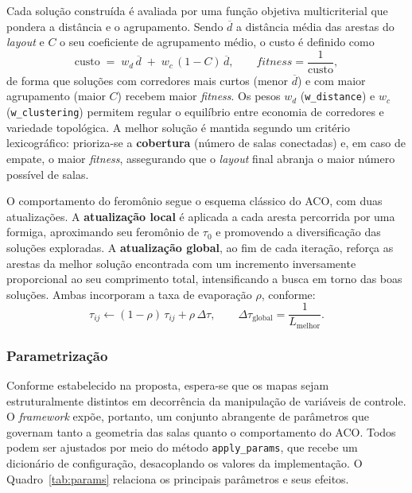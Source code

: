 \documentclass[12pt]{article}
\begin{document}
Cada solução construída é avaliada por uma função objetiva multicriterial que pondera a distância e o agrupamento. Sendo
$\overline{d}$ a distância média das arestas do \textit{layout} e $C$ o seu coeficiente de agrupamento médio, o custo é definido
como
\begin{equation}
    \text{custo} \;=\; w_{d}\,\overline{d} \;+\; w_{c}\,(1 - C)\,\overline{d},
    \qquad
    \textit{fitness} = \frac{1}{\text{custo}},
    \label{eq:fitness}
\end{equation}
de forma que soluções com corredores mais curtos (menor $\overline{d}$) e com maior agrupamento (maior $C$) recebem maior
\textit{fitness}. Os pesos $w_d$ (\texttt{w\_distance}) e $w_c$ (\texttt{w\_clustering}) permitem regular o equilíbrio entre
economia de corredores e variedade topológica. A melhor solução é mantida segundo um critério lexicográfico: prioriza-se a
\textbf{cobertura} (número de salas conectadas) e, em caso de empate, o maior \textit{fitness}, assegurando que o \textit{layout}
final abranja o maior número possível de salas.
 
O comportamento do feromônio segue o esquema clássico do ACO, com duas atualizações. A \textbf{atualização local} é aplicada a
cada aresta percorrida por uma formiga, aproximando seu feromônio de $\tau_0$ e promovendo a diversificação das soluções
exploradas. A \textbf{atualização global}, ao fim de cada iteração, reforça as arestas da melhor solução encontrada com um
incremento inversamente proporcional ao seu comprimento total, intensificando a busca em torno das boas soluções. Ambas
incorporam a taxa de evaporação $\rho$, conforme:
\begin{equation}
    \tau_{ij} \leftarrow (1-\rho)\,\tau_{ij} + \rho\,\Delta\tau,
    \qquad \Delta\tau_{\text{global}} = \frac{1}{L_{\text{melhor}}}.
    \label{eq:pheromone}
\end{equation}
 
\subsubsection{Parametrização}
Conforme estabelecido na proposta, espera-se que os mapas sejam estruturalmente distintos em decorrência da manipulação de
variáveis de controle. O \textit{framework} expõe, portanto, um conjunto abrangente de parâmetros que governam tanto a geometria
das salas quanto o comportamento do ACO. Todos podem ser ajustados por meio do método \texttt{apply\_params}, que recebe um
dicionário de configuração, desacoplando os valores da implementação. O Quadro~\ref{tab:params} relaciona os principais
parâmetros e seus efeitos.
 
\end{document}
